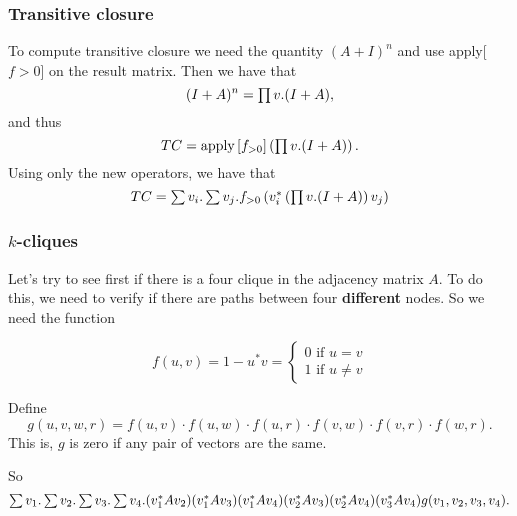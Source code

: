 \subsubsection{Transitive closure}

To compute transitive closure we need the quantity $(A+I)^n$ and use apply[$f>0$] on the result matrix. Then we have that $$(I+A)^n=\textstyle\prod v. (I+A),$$ and thus $$TC = \text{apply}\left[ f_{>0}\right]\left( \textstyle\prod v. (I+A) \right).$$
Using only the new operators, we have that $$TC=\textstyle\sum v_i. \textstyle\sum v_j. f_{>0}\left(v_i^*\left(\textstyle\prod v. (I+A)\right)v_j\right)$$

\subsubsection{$k$-cliques}

Let's try to see first if there is a four clique in the adjacency matrix $A$. To do this, we need to verify if there are paths between four \textbf{different} nodes. So we need the function 

\[
  			f(u,v)=1-u^*v=\begin{cases}
               0 \text{ if } u=v \\
               1 \text{ if } u\neq v
            \end{cases}
		\]

Define $$g(u,v,w,r)=f(u,v)\cdot f(u,w)\cdot f(u,r)\cdot f(v,w)\cdot f(v,r)\cdot f(w,r).$$ This is, $g$ is zero if any pair of vectors are the same.
		
So $$\textstyle\sum v_1.\textstyle\sum v_2. \textstyle\sum v_3. \textstyle\sum v_4. (v_1^*Av_2)(v_1^*Av_3)(v_1^*Av_4)(v_2^*Av_3)(v_2^*Av_4)(v_3^*Av_4)g(v_1,v_2,v_3,v_4).$$

\label{sec:extmatlang}